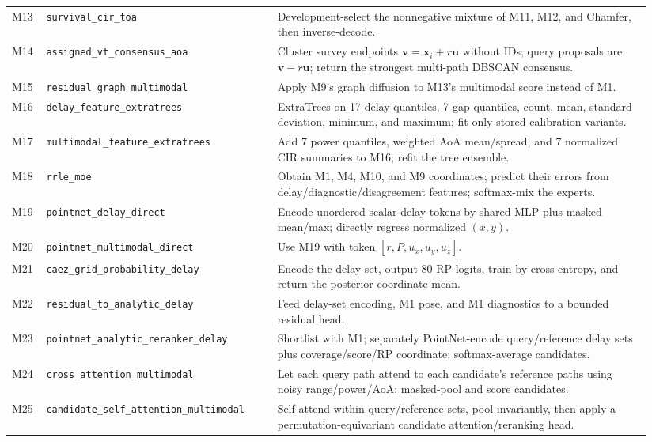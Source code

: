 \documentclass[10pt]{article}
\newcommand{\code}[1]{\nolinkurl{#1}}
\begin{document}
\begin{longtable}{@{}p{0.055\linewidth}p{0.34\linewidth}p{0.55\linewidth}@{}}
M13 & \code{survival_cir_toa} & Development-select the nonnegative mixture of M11, M12, and Chamfer, then inverse-decode.\\
M14 & \code{assigned_vt_consensus_aoa} & Cluster survey endpoints $\mathbf v=\mathbf x_i+r\mathbf u$ without IDs; query proposals are $\mathbf v-r\mathbf u$; return the strongest multi-path DBSCAN consensus.\\
M15 & \code{residual_graph_multimodal} & Apply M9's graph diffusion to M13's multimodal score instead of M1.\\
M16 & \code{delay_feature_extratrees} & ExtraTrees on 17 delay quantiles, 7 gap quantiles, count, mean, standard deviation, minimum, and maximum; fit only stored calibration variants.\\
M17 & \code{multimodal_feature_extratrees} & Add 7 power quantiles, weighted AoA mean/spread, and 7 normalized CIR summaries to M16; refit the tree ensemble.\\
M18 & \code{rrle_moe} & Obtain M1, M4, M10, and M9 coordinates; predict their errors from delay/diagnostic/disagreement features; softmax-mix the experts.\\
M19 & \code{pointnet_delay_direct} & Encode unordered scalar-delay tokens by shared MLP plus masked mean/max; directly regress normalized $(x,y)$.\\
M20 & \code{pointnet_multimodal_direct} & Use M19 with token $[r,P,u_x,u_y,u_z]$.\\
M21 & \code{caez_grid_probability_delay} & Encode the delay set, output 80 RP logits, train by cross-entropy, and return the posterior coordinate mean.\\
M22 & \code{residual_to_analytic_delay} & Feed delay-set encoding, M1 pose, and M1 diagnostics to a bounded residual head.\\
M23 & \code{pointnet_analytic_reranker_delay} & Shortlist with M1; separately PointNet-encode query/reference delay sets plus coverage/score/RP coordinate; softmax-average candidates.\\
M24 & \code{cross_attention_multimodal} & Let each query path attend to each candidate's reference paths using noisy range/power/AoA; masked-pool and score candidates.\\
M25 & \code{candidate_self_attention_multimodal} & Self-attend within query/reference sets, pool invariantly, then apply a permutation-equivariant candidate attention/reranking head.\\
\bottomrule
\end{longtable}
\normalsize
\end{document}

